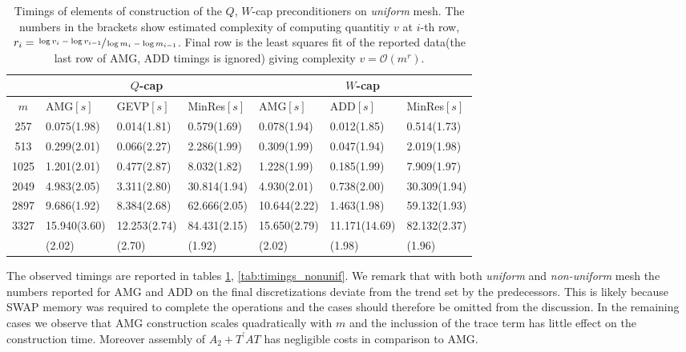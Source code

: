 \documentclass[10pt, a4paper]{article}
\newcommand{\dual}[1]{\ensuremath{{#1}^{\prime}}}
\begin{document}
\begin{table}[h]
  \caption{Timings of elements of construction of the $Q$, $W$-cap
  preconditioners on \textit{uniform} mesh. The numbers in the brackets show 
  estimated complexity of computing quantitiy $v$ at $i$-th row,
  $r_i=\sfrac{\log{v_i}-\log{v_{i-1}}}{\log{m_i}-\log{m_{i-1}}}$. Final row is
  the least squares fit of the reported data(the last row of AMG, ADD
  timings is ignored) giving complexity $v=\mathcal{O}(m^r)$.
}
\label{tab:timings_unif}
\footnotesize{
\begin{tabular}{c|lll|lll}
\hline
 & \multicolumn{3}{c|}{$Q$-cap} & \multicolumn{3}{c}{$W$-cap}\\
\hline
  $m$ & AMG$\left[s\right]$ & GEVP$\left[s\right]$ & MinRes$\left[s\right]$ &
        AMG$\left[s\right]$ & ADD$\left[s\right]$  & MinRes$\left[s\right]$ \\
\hline
  257  & 0.075(1.98)  & 0.014(1.81)  &  0.579(1.69)  & 0.078(1.94)  & 0.012(1.85)   & 0.514(1.73)  \\
  513  & 0.299(2.01)  & 0.066(2.27)  &  2.286(1.99)  & 0.309(1.99)  & 0.047(1.94)   & 2.019(1.98)  \\
  1025 & 1.201(2.01)  & 0.477(2.87)  &  8.032(1.82)  & 1.228(1.99)  & 0.185(1.99)   & 7.909(1.97)  \\
  2049 & 4.983(2.05)  & 3.311(2.80)  &  30.814(1.94) & 4.930(2.01)  & 0.738(2.00)   & 30.309(1.94) \\
  2897 & 9.686(1.92)  & 8.384(2.68)  &  62.666(2.05) & 10.644(2.22) & 1.463(1.98)   & 59.132(1.93) \\
  3327 & 15.940(3.60) & 12.253(2.74) &  84.431(2.15) & 15.650(2.79) & 11.171(14.69) & 82.132(2.37) \\
\hline
  & (2.02) & (2.70) & (1.92) &
    (2.02) & (1.98) & (1.96) \\
\hline
\end{tabular}
}
\end{table}
%
The observed timings are reported in tables \ref{tab:timings_unif},
\ref{tab:timings_nonunif}. We remark that with both \textit{uniform} and \textit{non-uniform} 
mesh the numbers reported for AMG and ADD on the final discretizations deviate 
from the trend set by the predecessors. This is likely because SWAP memory was 
required to complete the operations and the cases should therefore be omitted 
from the discussion. In the remaining cases we observe that AMG construction 
scales quadratically with $m$ and the inclussion of the trace term has little effect 
on the construction time. Moreover assembly of $A_2+\dual{T}AT$ has negligible 
costs in comparison to AMG.
\end{document}
